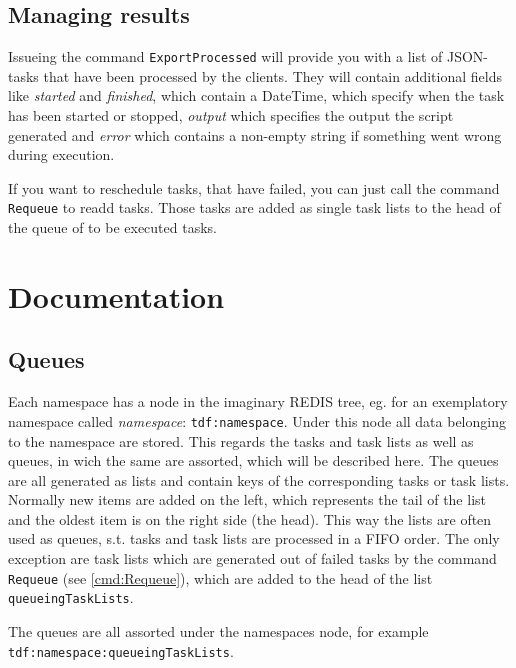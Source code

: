 \documentclass[a4paper,11pt]{article}
\begin{document}
\subsection{Managing results}
Issueing the command \texttt{ExportProcessed} will provide you with a list of JSON-tasks that have been processed by the clients. They will contain additional fields like \textit{started} and \textit{finished}, which contain a DateTime, which specify when the task has been started or stopped, \textit{output} which specifies the output the script generated and \textit{error} which contains a non-empty string if something went wrong during execution.

If you want to reschedule tasks, that have failed, you can just call the command \texttt{Requeue} to readd tasks. Those tasks are added as single task lists to the head of the queue of to be executed tasks.

\newpage

\section{Documentation}
\subsection{Queues\label{sec:queues}}
Each namespace has a node in the imaginary REDIS tree, eg. for an exemplatory namespace called \textit{namespace}: \texttt{tdf:namespace}. Under this node all data belonging to the namespace are stored. This regards the tasks and task lists as well as queues, in wich the same are assorted, which will be described here. The queues are all generated as lists and contain keys of the corresponding tasks or task lists. Normally new items are added on the left, which represents the tail of the list and the oldest item is on the right side (the head). This way the lists are often used as queues, s.t. tasks and task lists are processed in a FIFO order. The only exception are task lists which are generated out of failed tasks by the command \texttt{Requeue} (see \ref{cmd:Requeue}), which are added to the head of the list \texttt{queueingTaskLists}.

The queues are all assorted under the namespaces node, for example \texttt{tdf:namespace:queueingTaskLists}.
\end{document}
